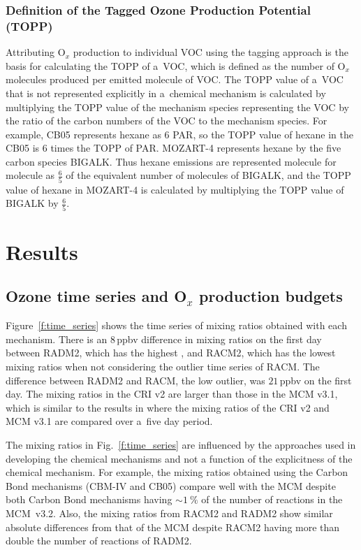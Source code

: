 \documentclass[acpd, online, hvmath]{copernicus}
\begin{document}
\subsubsection{Definition of the Tagged Ozone Production Potential
  (TOPP)}
\label{sss:TOPP}

Attributing O$_{x}$ production to individual VOC using the tagging
approach is the basis for calculating the TOPP of a~VOC, which is
defined as the number of O$_{x}$ molecules produced per emitted
molecule of VOC.  The TOPP value of a~VOC that is not represented
explicitly in a~chemical mechanism is calculated by multiplying the
TOPP value of the mechanism species representing the VOC by the ratio
of the carbon numbers of the VOC to the mechanism species.  For
example, CB05 represents hexane as $6$ PAR, so the TOPP value of
hexane in the CB05 is $6$ times the TOPP of PAR.  MOZART-4 represents
hexane by the five carbon species BIGALK.  Thus hexane emissions are
represented molecule for molecule as $\frac{6}{5}$ of the equivalent
number of molecules of \mbox{BIGALK}, and the TOPP value of hexane in
MOZART-4 is calculated by multiplying the TOPP value of BIGALK by
$\frac{6}{5}$.



\section{Results}
\label{s:results}


\subsection{Ozone time series and O$_{x}$ production budgets}
\label{ss:O3_time_series}

Figure~\ref{f:time_series} shows the time series of  mixing
ratios obtained with each mechanism.  There is an $8$\,\unit{ppbv}
difference in  mixing ratios on the first day between RADM2,
which has the highest , and RACM2, which has the lowest
 mixing ratios when not considering the outlier time series
of RACM.  The difference between RADM2 and RACM, the low outlier, was
$21$\,\unit{ppbv} on the first day.  The  mixing ratios in
the CRI v2 are larger than those in the MCM v3.1, which is similar to
the results in \citet{Jenkin:2008} where the  mixing ratios
of the CRI v2 and MCM v3.1 are compared over a~five day period.

The  mixing ratios in Fig.~\ref{f:time_series} are influenced by the approaches used in developing the chemical mechanisms and not a function of the explicitness of the chemical mechanism.
For example, the  mixing ratios obtained using the Carbon Bond mechanisms 
(CBM-IV and CB05) compare well with the MCM despite both Carbon Bond mechanisms 
having $\sim1~\%$ of the number of reactions in the MCM~v3.2.
Also, the  mixing ratios from RACM2 and RADM2 show similar 
absolute differences from that of the MCM despite RACM2 having more than
double the number of reactions of RADM2.  
\end{document}
